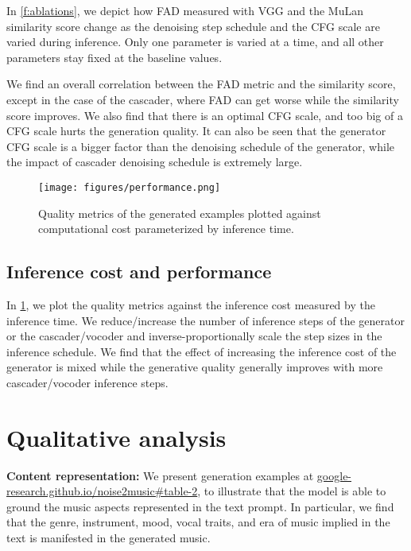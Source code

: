 \documentclass[nohyperref]{article}
\newcommand{\website}{https://google-research.github.io/noise2music}
\newcommand{\websiteDisplay}{google-research.github.io/noise2music}
\theoremstyle{plain}
\theoremstyle{definition}
\theoremstyle{remark}
\begin{document}
In \cref{f:ablations}, we depict how FAD measured with VGG and the MuLan similarity score change as the denoising step schedule and the CFG scale are varied during inference. Only one parameter is varied at a time, and all other parameters stay fixed at the baseline values.

We find an overall correlation between the FAD metric and the similarity score, except in the case of the cascader, where FAD can get worse while the similarity score improves. We also find that there is an optimal CFG scale, and too big of a CFG scale hurts the generation quality. It can also be seen that the generator CFG scale is a bigger factor than the denoising schedule of the generator, while the impact of cascader denoising schedule is extremely large.

\begin{figure}[ht]
\begin{center}
\centerline{\texttt{[image: figures/performance.png]}}
\caption{Quality metrics of the generated examples plotted against computational cost parameterized by inference time.}
\label{f:cost}
\end{center}
\vskip -0.25in
\end{figure}

\subsection{Inference cost and performance}

In \cref{f:cost}, we plot the quality metrics against the inference cost measured by the inference time. We reduce/increase the number of inference steps of the generator or the cascader/vocoder and inverse-proportionally scale the step sizes in the inference schedule. We find that the effect of increasing the inference cost of the generator is mixed while the generative quality generally improves with more cascader/vocoder inference steps.

\section{Qualitative analysis}

\textbf{Content representation:}  We present generation examples at \href{\website#table-2}{\websiteDisplay\#table-2}, to illustrate that the model is able to ground the music aspects represented in the text prompt. In particular, we find that the genre, instrument, mood, vocal traits, and era of music implied in the text is manifested in the generated music.
\end{document}
